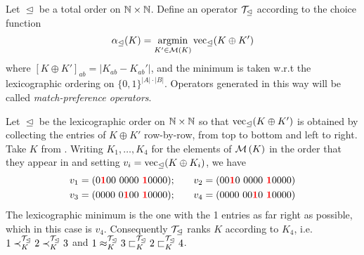 \begin{definition}%
   \label{tourn_def_matchpref_operator}

    Let $\trianglelefteq$ be a total order on $\mathbb{N} \times \mathbb{N}$. Define an
    operator $\mathcal{T}_{\trianglelefteq}$ according to the choice function
    \begin{equation}
        \label{tourn_eqn_match_preference_alpha_definition}
        \alpha_{\trianglelefteq}(K)
        = \argmin_{K' \in \minch{K}}{
            \vect_{\trianglelefteq}(K \oplus K')
        }
    \end{equation}
    where $[K \oplus K']_{ab} = |K_{ab} - K_{ab}'|$, and the minimum is taken
    w.r.t the lexicographic ordering on $\{0,1\}^{|A| \cdot
    |B|}$.\footnotemark{} Operators generated in this way will be called
    \emph{match-preference operators}.

\end{definition}


\begin{example}
    \label{tourn_ex_match_preference_example}

    Let $\trianglelefteq$ be the lexicographic order\footnotemark{} on $\mathbb{N}
    \times \mathbb{N}$ so that $\operatorname{vec}_{\trianglelefteq}(K \oplus K')$ is obtained by
    collecting the entries of $K \oplus K'$ row-by-row, from top to
    bottom and left to right.
    Take $K$ from . Writing $K_1,\ldots,K_4$ for the elements of
    $\operatorname{\mathcal{M}}\left({K}\right)$ in the order that they appear in  and setting
    $v_i = \operatorname{vec}_{\trianglelefteq}(K \oplus K_i)$, we have
    \begin{align*}
        v_1 = (0\bm{{\color{red}1}}00\ 0000\ \bm{{\color{red}1}}0000);
        & \quad \quad
        v_2 = (00\bm{{\color{red}1}}0\ 0000\ \bm{{\color{red}1}}0000) \\
        v_3 = (0000\ 0\bm{{\color{red}1}}00\ \bm{{\color{red}1}}0000);
        & \quad \quad
        v_4 = (0000\ 00\bm{{\color{red}1}}0\ \bm{{\color{red}1}}0000)
    \end{align*}
    The lexicographic minimum is the one with the 1 entries as far right as
    possible, which in this case is $v_4$. Consequently
    $\mathcal{T}_{\trianglelefteq}$ ranks $K$ according to $K_4$, i.e. $1
    \prec_K^{\mathcal{T}_{\trianglelefteq}} 2 \prec_K^{\mathcal{T}_{\trianglelefteq}} 3$ and $1
    \approx_K^{\mathcal{T}_{\trianglelefteq}} 3 \sqsubset_K^{\mathcal{T}_{\trianglelefteq}} 2
    \sqsubset_K^{\mathcal{T}_{\trianglelefteq}} 4$.

\end{example}

